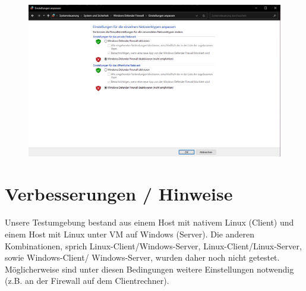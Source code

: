 \documentclass[11pt, a4paper]{article}
\begin{document}
\begin{figure}[H]
\centering
\includegraphics[width=\textwidth]{graphics/firewall_aus}
\caption{}\label{fwaus}
\end{figure}

\section{Verbesserungen / Hinweise}
Unsere Testumgebung bestand aus einem Host mit nativem Linux (Client) und einem
Host mit Linux unter VM auf Windows (Server). Die anderen Kombinationen, sprich
Linux-Client/Windows-Server, Linux-Client/Linux-Server, sowie Windows-Client/
Windows-Server, wurden daher noch nicht getestet. Möglicherweise sind unter diesen
Bedingungen weitere Einstellungen notwendig (z.B. an der Firewall auf dem
Clientrechner).
\end{document}
